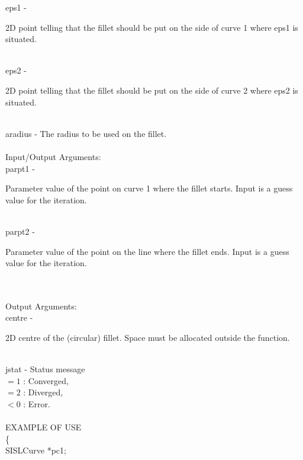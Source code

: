         \>\>    {\fov eps1}    \> - \>
        \begin{minipg2}
          2D point telling that the fillet should be put on
          the side of curve 1 where {\fov eps1} is situated.
        \end{minipg2}\\[0.8ex]
        \>\>    {\fov eps2}    \> - \>
        \begin{minipg2}
          2D point telling that the fillet should be put on the
          side of curve 2 where {\fov eps2} is situated.
        \end{minipg2}\\[0.8ex]
        \>\>    {\fov aradius} \> - \> The radius to be used on the fillet.\\
\\
        \>Input/Output Arguments:\\
        \>\>    {\fov parpt1}  \> - \>
        \begin{minipg2}
          Parameter value of the point on curve 1 where the
          fillet starts. Input is a guess value for the iteration.
        \end{minipg2}\\[0.8ex]
        \>\>    {\fov parpt2}  \> - \>
        \begin{minipg2}
          Parameter value of the point on the line where the
          fillet ends. Input is a guess value for the iteration.
        \end{minipg2}\\[0.8ex]
\\
        \>Output Arguments:\\
        \>\>    {\fov centre}  \> - \>
        \begin{minipg2}
          2D centre of the (circular) fillet.  Space must be
          allocated outside the function.
        \end{minipg2}\\[0.8ex]
\newpagetabs
        \>\>    {\fov jstat} \> - \> Status message\\
                \>\>\>\>\> $= 1$      : Converged,\\
                \>\>\>\>\> $= 2$      : Diverged,\\
                \>\>\>\>\> $< 0$      : Error.\\
\\
EXAMPLE OF USE\\
        \>      \{ \\
        \>\>    SISLCurve \> *{\fov pc1};\\

